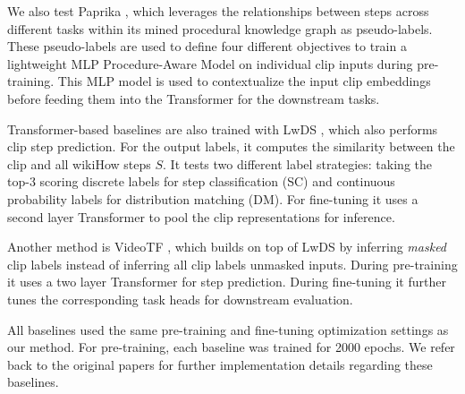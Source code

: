We also test Paprika \citep{paprika}, which leverages the relationships between steps across different tasks within its mined procedural knowledge graph as pseudo-labels. These pseudo-labels are used to define four different objectives to train a lightweight MLP Procedure-Aware Model on individual clip inputs during pre-training. This MLP model is used to contextualize the input clip embeddings before feeding them into the Transformer for the downstream tasks.

Transformer-based baselines are also trained with LwDS \citep{lwds}, which also performs clip step prediction. For the output labels, it computes the similarity between the clip and all wikiHow steps $S$. It tests two different label strategies: taking the top-3 scoring discrete labels for step classification (SC) and continuous probability labels for distribution matching (DM). For fine-tuning it uses a second layer Transformer to pool the clip representations for inference. 

Another method is VideoTF \citep{videotf}, which builds on top of LwDS by inferring \emph{masked} clip labels instead of inferring all clip labels unmasked inputs. During pre-training it uses a two layer Transformer for step prediction. During fine-tuning it further tunes the corresponding task heads for downstream evaluation. 

All baselines used the same pre-training and fine-tuning optimization settings as our method. For pre-training, each baseline was trained for 2000 epochs. We refer back to the original papers for further implementation details regarding these baselines. 


